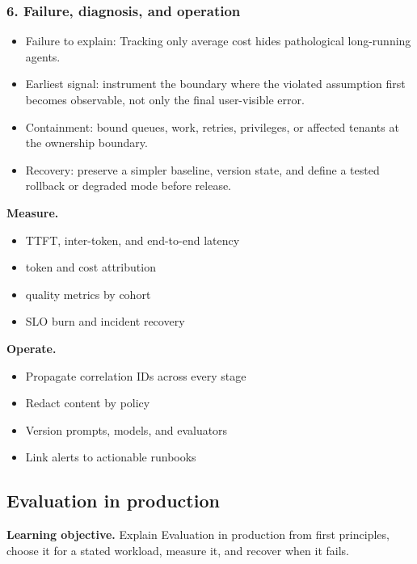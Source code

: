 \subsubsection*{6. Failure, diagnosis, and operation}
\begin{itemize}
\item Failure to explain: Tracking only average cost hides pathological long-running agents.
\item Earliest signal: instrument the boundary where the violated assumption first becomes observable, not only the final user-visible error.
\item Containment: bound queues, work, retries, privileges, or affected tenants at the ownership boundary.
\item Recovery: preserve a simpler baseline, version state, and define a tested rollback or degraded mode before release.
\end{itemize}
\textbf{Measure.}\begin{itemize}
\item TTFT, inter-token, and end-to-end latency
\item token and cost attribution
\item quality metrics by cohort
\item SLO burn and incident recovery
\end{itemize}
\textbf{Operate.}\begin{itemize}
\item Propagate correlation IDs across every stage
\item Redact content by policy
\item Version prompts, models, and evaluators
\item Link alerts to actionable runbooks
\end{itemize}
\subsection{Evaluation in production}
\textbf{Learning objective.} Explain Evaluation in production from first principles, choose it for a stated workload, measure it, and recover when it fails.
